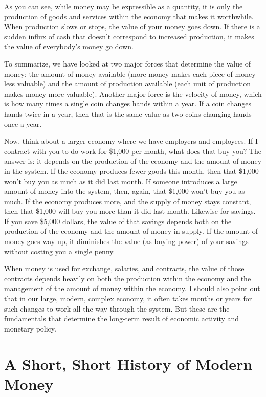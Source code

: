 As you can see, while money may be expressible as a quantity, it is only
the production of goods and services within the economy that makes it
worthwhile. When production slows or stops, the value of your money
goes down. If there is a sudden influx of cash that doesn’t correspond
to increased production, it makes the value of everybody’s money go
down. 


To summarize, we have
looked at two major forces that determine the value of money: the
amount of money available (more money makes each piece of money less
valuable) and the amount of production available (each unit of
production makes money more valuable). Another major force is the
velocity of money, which is how many times a single coin changes hands
within a year. If a coin changes hands twice in a year, then that is
the same value as two coins changing hands once a year.


Now, think about a larger economy where we have employers and employees.
If I contract with you to do work for \$1,000 per month, what does that
buy you?  The answer is: it depends on the production of the economy
and the amount of money in the system. If the economy produces fewer
goods this month, then that \$1,000 won’t buy you as much as it did
last month. If someone introduces a large amount of money into the
system, then, again, that \$1,000 won’t buy you as much. If the economy
produces more, and the supply of money stays constant, then that
\$1,000 will buy you more than it did last month. Likewise for savings.
If you save \$5,000 dollars, the value of that savings depends both on
the production of the economy and the amount of money in supply. If the
amount of money goes way up, it diminishes the value (as buying power)
of your savings without costing you a single penny.


When money is used for exchange, salaries, and contracts, the value of
those contracts depends heavily on both the production within the
economy and the management of the amount of money within the economy. I
should also point out that in our large, modern, complex economy, it
often takes months or years for such changes to work all the way
through the system. But these are the fundamentals that determine the
long-term result of economic activity and monetary policy.

\section{A Short, Short History of Modern Money}

